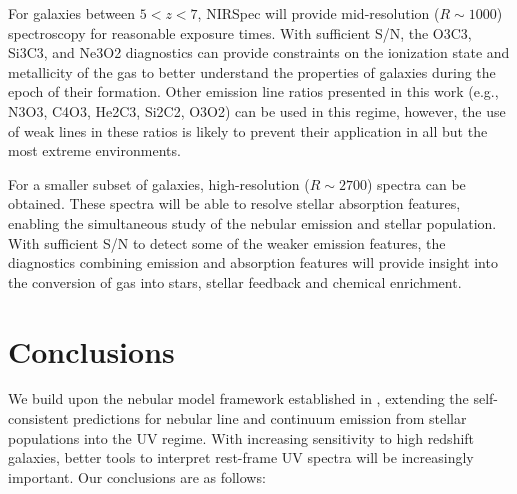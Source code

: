 \documentclass[preprint2,trackchanges]{aastex62}
\begin{document}
For galaxies between $5 < z < 7$, NIRSpec will provide mid-resolution ($R\sim1000$) spectroscopy for reasonable exposure times. With sufficient S/N, the O3C3, Si3C3, and Ne3O2 diagnostics can provide constraints on the ionization state and metallicity of the gas to better understand the properties of galaxies during the epoch of their formation. Other emission line ratios presented in this work (e.g., N3O3, C4O3, He2C3, Si2C2, O3O2) can be used in this regime, however, the use of weak lines in these ratios is likely to prevent their application in all but the most extreme environments.

For a smaller subset of galaxies, high-resolution ($R\sim2700$) spectra can be obtained. These spectra will be able to resolve stellar absorption features, enabling the simultaneous study of the nebular emission and stellar population. With sufficient S/N to detect some of the weaker emission features, the diagnostics combining emission and absorption features will provide insight into the conversion of gas into stars, stellar feedback and chemical enrichment.

\section{Conclusions} \label{sec:conclusions}
We build upon the nebular model framework established in \citet{Byler+2017}, extending the self-consistent predictions for nebular line and continuum emission from stellar populations into the UV regime. With increasing sensitivity to high redshift galaxies, better tools to interpret rest-frame UV spectra will be increasingly important. Our conclusions are as follows:
\end{document}
